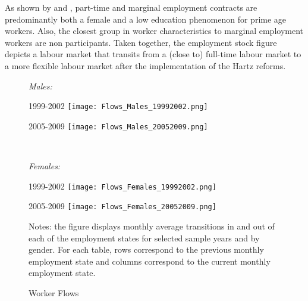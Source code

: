 \documentclass[12pt, a4paper]{article}
\begin{document}
As shown by \cite{Galasi17} and \cite{CaLaRo18}, part-time and marginal employment contracts are predominantly both a female and a low education phenomenon for prime age workers. Also, the closest group in worker characteristics to marginal employment workers are non participants. Taken together, the employment stock figure depicts a labour market that transits from a (close to) full-time labour market to a more flexible labour market after the implementation of the Hartz reforms.

\begin{figure}[!t]
	\centering
	\begin{flushleft}
		\emph{Males:}\\
	\end{flushleft}
	\vspace{2mm}
	\begin{minipage}[b]{0.48\textwidth}{1999-2002}
		\centering
		\texttt{[image: Flows\_Males\_19992002.png]}
	\end{minipage}
	\begin{minipage}[b]{0.48\textwidth}{2005-2009}
		\centering
		\texttt{[image: Flows\_Males\_20052009.png]}
	\end{minipage}\\
	\vspace{2mm}
	\begin{flushleft}
		\emph{Females:}\\
	\end{flushleft}
	\vspace{2mm}
	\begin{minipage}[b]{0.48\textwidth}{1999-2002}
		\centering
		\texttt{[image: Flows\_Females\_19992002.png]}
	\end{minipage}
	\begin{minipage}[b]{0.48\textwidth}{2005-2009}
		\centering
		\texttt{[image: Flows\_Females\_20052009.png]}
	\end{minipage}
	\footnotesize{
		\justifying Notes: the figure displays monthly average transitions in and out of each of the employment states for selected sample years and by gender. For each table, rows correspond to the previous monthly employment state and columns correspond to the current monthly employment state. \par}
	\captionsetup{font=small,justification=raggedright}
	\caption{Worker Flows}\label{fig:worker_flows}
\end{figure}
\end{document}
